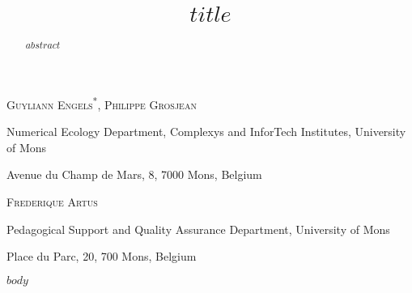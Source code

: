 \documentclass{aims}
\title[$runtitle$] %
      {$title$}
\author[Guyliann Engels, Philippe Grosjean and Frédérique Artus]{}
\theoremstyle{definition}
\begin{document}
\maketitle

\centerline{\scshape Guyliann Engels\textsuperscript{*}, Philippe Grosjean}
\medskip
{\footnotesize
 \centerline{Numerical Ecology Department, Complexys and InforTech Institutes, University of Mons}
   \centerline{Avenue du Champ de Mars, 8, 7000 Mons, Belgium}
} %

\medskip

\centerline{\scshape Frederique Artus}

\medskip
{\footnotesize
 \centerline{ Pedagogical Support and Quality Assurance Department, University of Mons}
   \centerline{Place du Parc, 20, 700 Mons, Belgium}
}

\bigskip



\begin{abstract}
  $abstract$
\end{abstract}

$body$

\end{document}
